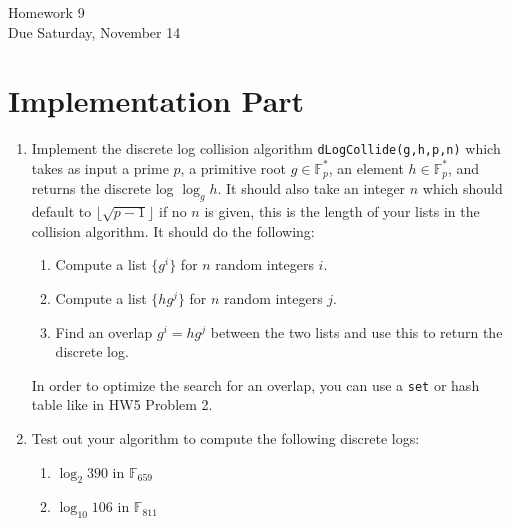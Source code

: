 \documentclass[11pt]{article}
\newcommand{\bF}{\mathbb{F}}
\begin{document}
\begin{center}
\Large {Homework 9}\\
\small {Due Saturday, November 14}
\end{center}
\section*{Implementation Part}
\begin{enumerate}
  \item{
  Implement the discrete log collision algorithm \verb|dLogCollide(g,h,p,n)| which takes as input a prime $p$, a primitive root $g\in\bF_p^*$, an element $h\in\bF_p^*$, and returns the discrete log $\log_g h$.  It should also take an integer $n$ which should default to $\lfloor\sqrt{p-1}\rfloor$ if no $n$ is given, this is the length of your lists in the collision algorithm.  It should do the following:
  \begin{enumerate}[(1)]
    \item{
    Compute a list $\{g^i\}$ for $n$ random integers $i$.
    }
    \item{
    Compute a list $\{hg^j\}$ for $n$ random integers $j$.
    }
    \item{
    Find an overlap $g^i = hg^j$ between the two lists and use this to return the discrete log.
    }
  \end{enumerate}
  In order to optimize the search for an overlap, you can use a \verb|set| or hash table like in HW5 Problem 2.
  }
  \item{
  Test out your algorithm to compute the following discrete logs:
  \begin{enumerate}
    \item{
    $\log_2 390$ in $\mathbb{F}_{659}$
    }
    \item{
    $\log_{10}106$ in $\mathbb{F}_{811}$
    }
  \end{enumerate}
  }
\end{enumerate}
\end{document}
